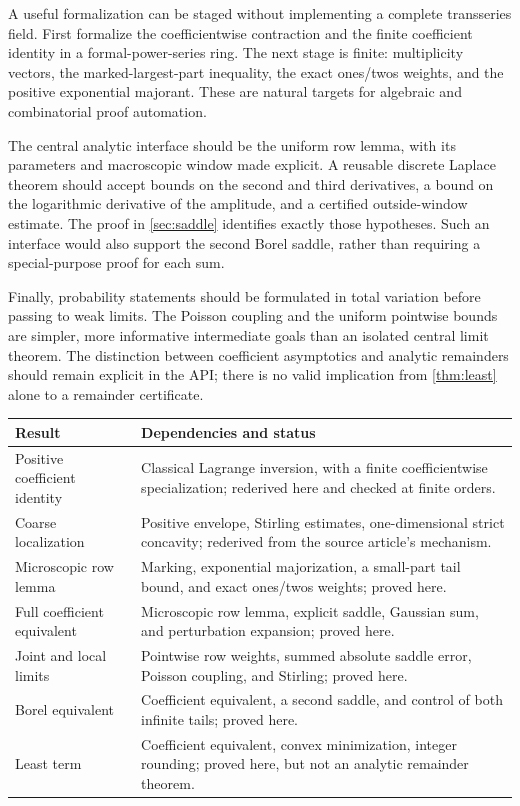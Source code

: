 \documentclass[11pt,a4paper]{article}
\theoremstyle{definition}
\numberwithin{equation}{section}
\begin{document}
A useful formalization can be staged without implementing a complete
transseries field. First formalize the coefficientwise contraction and the
finite coefficient identity in a formal-power-series ring. The next stage
is finite: multiplicity vectors, the marked-largest-part inequality, the
exact ones/twos weights, and the positive exponential majorant. These are
natural targets for algebraic and combinatorial proof automation.

The central analytic interface should be the uniform row lemma, with its
parameters and macroscopic window made explicit. A reusable discrete
Laplace theorem should accept bounds on the second and third derivatives,
a bound on the logarithmic derivative of the amplitude, and a certified
outside-window estimate. The proof in \cref{sec:saddle} identifies exactly
those hypotheses. Such an interface would also support the second Borel
saddle, rather than requiring a special-purpose proof for each sum.

Finally, probability statements should be formulated in total variation
before passing to weak limits. The Poisson coupling and the uniform
pointwise bounds are simpler, more informative intermediate goals than an
isolated central limit theorem. The distinction between coefficient
asymptotics and analytic remainders should remain explicit in the API;
there is no valid implication from \cref{thm:least} alone to a remainder
certificate.

\begin{center}
\small
\begin{tabular}{@{}p{}p{}@{}}
\toprule
Result & Dependencies and status\\
\midrule
Positive coefficient identity & Classical Lagrange inversion, with a finite
coefficientwise specialization; rederived here and checked at finite orders.\\
Coarse localization & Positive envelope, Stirling estimates, one-dimensional
strict concavity; rederived from the source article's mechanism.\\
Microscopic row lemma & Marking, exponential majorization, a small-part tail
bound, and exact ones/twos weights; proved here.\\
Full coefficient equivalent & Microscopic row lemma, explicit saddle,
Gaussian sum, and perturbation expansion; proved here.\\
Joint and local limits & Pointwise row weights, summed absolute saddle error,
Poisson coupling, and Stirling; proved here.\\
Borel equivalent & Coefficient equivalent, a second saddle, and control of
both infinite tails; proved here.\\
Least term & Coefficient equivalent, convex minimization, integer rounding;
proved here, but not an analytic remainder theorem.\\
\bottomrule
\end{tabular}
\end{center}
\end{document}
